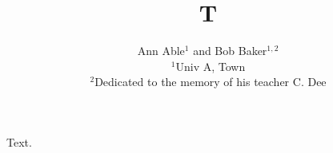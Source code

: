\documentclass{article}
\title{T}
\author{Ann Able$^{1}$ and Bob Baker$^{1,2}$\\
$^1$Univ A, Town\\
$^2$Dedicated to the memory of his teacher C. Dee}
\date{}
\begin{document}
\maketitle
Text.
\end{document}
